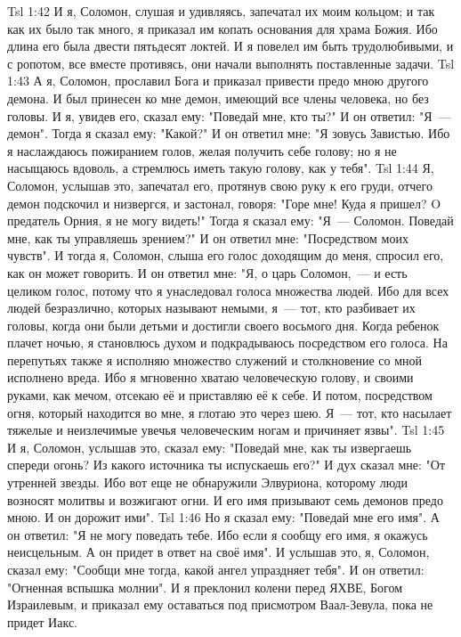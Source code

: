 \vs Tsl 1:42 
И я, Соломон, слушая и удивляясь, запечатал их моим кольцом; и так как их было так много, я приказал им копать основания для храма Божия. Ибо длина его была двести пятьдесят локтей. И я повелел им быть трудолюбивыми, и с ропотом, все вместе противясь, они начали выполнять поставленные задачи.
\vs Tsl 1:43 
А я, Соломон, прославил Бога и приказал привести предо мною другого демона. И был принесен ко мне демон, имеющий все члены человека, но без головы. И я, увидев его, сказал ему: "Поведай мне, кто ты?" И он ответил: "Я~--- демон". Тогда я сказал ему: "Какой?" И он ответил мне: "Я зовусь Завистью. Ибо я наслаждаюсь пожиранием голов, желая получить себе голову; но я не насыщаюсь вдоволь, а стремлюсь иметь такую голову, как у тебя".
\vs Tsl 1:44 
Я, Соломон, услышав это, запечатал его, протянув свою руку к его груди, отчего демон подскочил и низвергся, и застонал, говоря: "Горе мне! Куда я пришел? O предатель Орния, я не могу видеть!" Тогда я сказал ему: "Я~--- Соломон. Поведай мне, как ты управляешь зрением?" И он ответил мне: "Посредством моих чувств". И тогда я, Соломон, слыша его голос доходящим до меня, спросил его, как он может говорить. И он ответил мне: "Я, о царь Соломон,~--- и есть целиком голос, потому что я унаследовал голоса множества людей. Ибо для всех людей безразлично, которых называют немыми, я~--- тот, кто разбивает их головы, когда они были детьми и достигли своего восьмого дня. Когда ребенок плачет ночью, я становлюсь духом и подкрадываюсь посредством его голоса. На перепутьях также я исполняю множество служений и столкновение со мной исполнено вреда. Ибо я мгновенно хватаю человеческую голову, и своими руками, как мечом, отсекаю её и приставляю её к себе. И потом, посредством огня, который находится во мне, я глотаю это через шею. Я~--- тот, кто насылает тяжелые и неизлечимые увечья человеческим ногам и причиняет язвы".
\vs Tsl 1:45 
И я, Соломон, услышав это, сказал ему: "Поведай мне, как ты извергаешь спереди огонь? Из какого источника ты испускаешь его?" И дух сказал мне: "От утренней звезды. Ибо вот еще не обнаружили Элвуриона, которому люди возносят молитвы и возжигают огни. И его имя призывают семь демонов предо мною. И он дорожит ими".
\vs Tsl 1:46 
Но я сказал ему: "Поведай мне его имя". А он ответил: "Я не могу поведать тебе. Ибо если я сообщу его имя, я окажусь неисцельным. А он придет в ответ на своё имя". И услышав это, я, Соломон, сказал ему: "Сообщи мне тогда, какой ангел упраздняет тебя". И он ответил: "Огненная вспышка молнии". И я преклонил колени перед ЯХВЕ, Богом Израилевым, и приказал ему оставаться под присмотром Ваал-Зевула, пока не придет Иакс.
